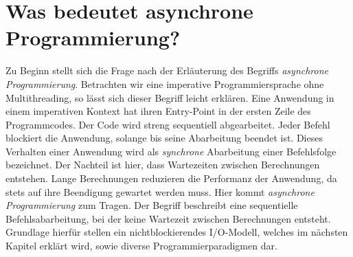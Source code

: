 \section{Was bedeutet asynchrone Programmierung?}
Zu Beginn stellt sich die Frage nach der Erläuterung des Begriffs \textit{asynchrone Programmierung}. Betrachten wir eine imperative Programmiersprache ohne Multithreading, so lässt sich dieser Begriff leicht erklären. Eine Anwendung in einem imperativen Kontext hat ihren Entry-Point in der ersten Zeile des Programmcodes. Der Code wird streng sequentiell abgearbeitet. Jeder Befehl blockiert die Anwendung, solange bis seine Abarbeitung beendet ist. Dieses Verhalten einer Anwendung wird als \textit{synchrone} Abarbeitung einer Befehlsfolge bezeichnet. Der Nachteil ist hier, dass Wartezeiten zwischen Berechnungen entstehen. Lange Berechnungen reduzieren die Performanz der Anwendung, da stets auf ihre Beendigung gewartet werden muss. Hier kommt \textit{asynchrone Programmierung} zum Tragen. Der Begriff beschreibt eine sequentielle Befehlsabarbeitung, bei der keine Wartezeit zwischen Berechnungen entsteht. Grundlage hierfür stellen ein nichtblockierendes I/O-Modell, welches im nächsten Kapitel erklärt wird, sowie diverse Programmierparadigmen dar.

